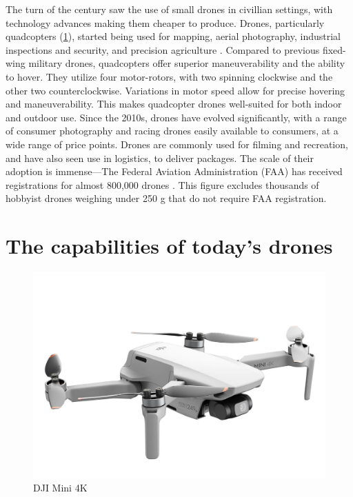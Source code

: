 The turn of the century saw the use of small drones in civillian settings, with
technology advances making them cheaper to produce. Drones, particularly
quadcopters (\cref{fig:dji-mini-4k}), started being used for mapping, aerial
photography, industrial inspections and security, and precision agriculture
\cite{giones2017}. Compared to previous fixed-wing military drones, quadcopters
offer superior maneuverability and the ability to hover. They utilize four
motor-rotors, with two spinning clockwise and the other two counterclockwise.
Variations in motor speed allow for precise hovering and maneuverability. This
makes quadcopter drones well-suited for both indoor and outdoor use.  Since the
2010s, drones have evolved significantly, with a range of consumer photography
and racing drones easily available to consumers, at a wide range of price
points. Drones are commonly used for filming and recreation, and have also seen
use in logistics, to deliver packages. The scale of their adoption is
immense---The Federal Aviation Administration (FAA) has received registrations
for almost 800,000 drones \cite{faa_drones_2024}.  This figure excludes
thousands of hobbyist drones weighing under 250 g that do not require FAA
registration.

\section{The capabilities of today's drones}
\label{sec:drone-capabilities}

\begin{figure}[htbp]
\centerline{\includegraphics[width = .5\textwidth]{figs/dji-mini-4k.jpg}}
\caption{DJI Mini 4K}
\label{fig:dji-mini-4k}
\end{figure}

